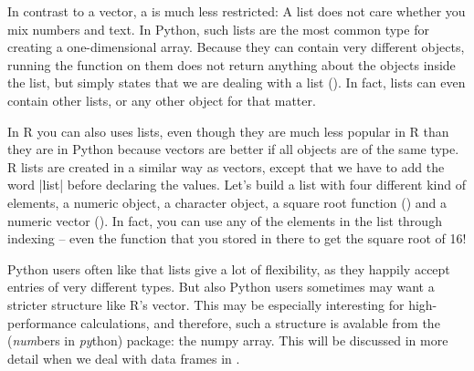 

In contrast to a vector, a  is much less restricted: A list does not care
whether you mix numbers and text. In Python, such lists are the most common type for creating
a one-dimensional array. Because they
can contain very different objects, running the  function on them
does not return anything about the objects inside the list, but simply states that we
are dealing with a list ().
In fact, lists can even contain other lists, or any other object for
that matter.

In R you can also uses lists, even though they are much less popular in R than
they are in Python because vectors are better if all objects are of the same type.
R lists are created in a similar way as vectors, except that we have to add the word |list|
before declaring the values. Let's build a list with four different
kind of elements, a numeric object, a character object, a square root
function () and a numeric vector (). In fact, you
can use any of the elements in the list through indexing -- even the
function  that you stored in there to get the square root of
16!


Python users often like that lists give  a lot of flexibility, as they happily accept
entries of very different types. But also Python users sometimes may want a stricter
structure like R's vector. This may be especially interesting for
high-performance calculations, and therefore, such a structure is
avalable from the  (\emph{num}bers in \emph{py}thon)
package: the numpy array.
This will be discussed in more detail when we deal with data frames in .


